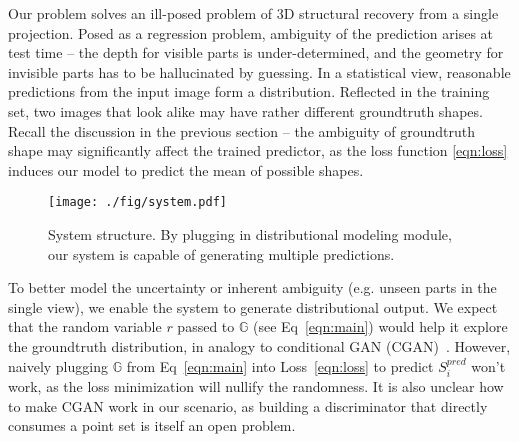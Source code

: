 \documentclass[10pt,twocolumn,letterpaper]{article}
\begin{document}
Our problem solves an ill-posed problem of 3D structural recovery from a single projection. Posed as a regression problem, ambiguity of the prediction arises at test time -- the depth for visible parts is under-determined, and the geometry for invisible parts has to be hallucinated by guessing. In a statistical view, reasonable predictions from the input image form a distribution.  Reflected in the training set, two images that look alike may have rather different groundtruth shapes. Recall the discussion in the previous section -- the ambiguity of groundtruth shape may significantly affect the trained predictor, as the loss function \eqref{eqn:loss} induces our model to predict the mean of possible shapes.  

\begin{figure}[t!]
  \centering
  \texttt{[image: ./fig/system.pdf]}
  \caption{System structure. By plugging in distributional modeling module, our system is capable of generating multiple predictions. }
  \label{fig:network}%
\end{figure}%

To better model the uncertainty or inherent ambiguity (e.g. unseen parts in the single view), we enable the system to generate distributional output. We expect that the random variable $r$ passed to $\mathbb{G}$ (see Eq~\eqref{eqn:main}) would help it explore the groundtruth distribution, in analogy to conditional GAN (CGAN)~\cite{mirza2014conditional}. However, naively plugging $\mathbb{G}$ from Eq~\eqref{eqn:main} into Loss~\eqref{eqn:loss} to predict $S_i^{pred}$ won't work, as the loss minimization will nullify the randomness. It is also unclear how to make CGAN work in our scenario, as building a discriminator that directly consumes a point set is itself an open problem. 
\end{document}
